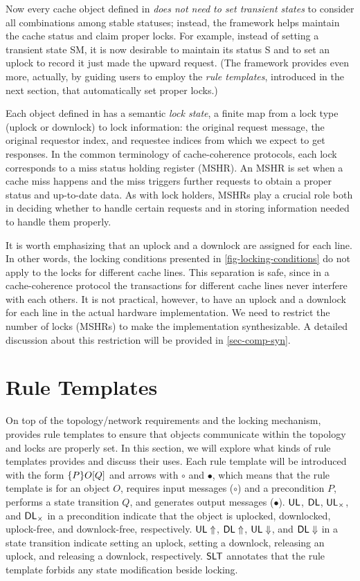 Now every cache object defined in \hemiola{} \emph{does not need to set transient states} to consider all combinations among stable statuses;
instead, the framework helps maintain the cache status and claim proper locks.
For example, instead of setting a transient state SM, it is now desirable to maintain its status S and to set an uplock to record it just made the upward request.
(The framework provides even more, actually, by guiding users to employ the \emph{rule templates}, introduced in the next section, that automatically set proper locks.)

Each object defined in \hemiola{} has a semantic \emph{lock state}, a finite map from a lock type (uplock or downlock) to lock information: the original request message, the original requestor index, and requestee indices from which we expect to get responses.
In the common terminology of cache-coherence protocols, each lock corresponds to a miss status holding register (MSHR).
An MSHR is set when a cache miss happens and the miss triggers further requests to obtain a proper status and up-to-date data.
As with \hemiola{} lock holders, MSHRs play a crucial role both in deciding whether to handle certain requests and in storing information needed to handle them properly.

It is worth emphasizing that an uplock and a downlock are assigned for each line.
In other words, the locking conditions presented in \autoref{fig-locking-conditions} do not apply to the locks for different cache lines.
This separation is safe, since in a cache-coherence protocol the transactions for different cache lines never interfere with each others.
It is not practical, however, to have an uplock and a downlock for each line in the actual hardware implementation.
We need to restrict the number of locks (MSHRs) to make the implementation synthesizable.
A detailed discussion about this restriction will be provided in \autoref{sec-comp-syn}.

\section{Rule Templates}
\label{sec-rule-templates}

On top of the topology/network requirements and the locking mechanism, \hemiola{} provides rule templates to ensure that objects communicate within the topology and locks are properly set.
In this section, we will explore what kinds of rule templates \hemiola{} provides and discuss their uses.
Each rule template will be introduced with the form $\{P\}O\lbrack Q\rbrack$ and arrows with $\circ$ and $\bullet$, which means that the rule template is for an object $O$, requires input messages ($\circ$) and a precondition $P$, performs a state transition $Q$, and generates output messages ($\bullet$).
$\textsf{UL}$, $\textsf{DL}$, $\textsf{UL}_{\times}$, and $\textsf{DL}_{\times}$ in a precondition indicate that the object is uplocked, downlocked, uplock-free, and downlock-free, respectively.
$\textsf{UL}\Uparrow$, $\textsf{DL}\Uparrow$, $\textsf{UL}\Downarrow$, and $\textsf{DL}\Downarrow$ in a state transition indicate setting an uplock, setting a downlock, releasing an uplock, and releasing a downlock, respectively.
$\textsf{SLT}{}$ annotates that the rule template forbids any state modification beside locking.

